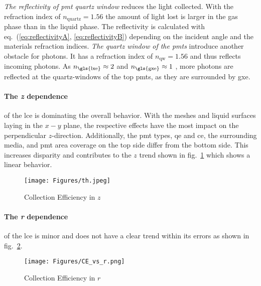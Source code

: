 \emph{The reflectivity of \gls{pmt} quartz window} reduces the light collected. With the refraction index of $ n_\mathrm{quartz} = 1.56 $ the amount of light lost is larger in the gas phase than in the liquid phase. The reflectivity is calculated with eq.~(\ref{eq:reflectivityA}, \ref{eq:reflectivityB}) depending on the incident angle and the materials refraction indices.
\emph{The quartz window of the \glspl{pmt}} introduce another obstacle for photons.
It has a refraction index of $ n_\mathrm{qw} = 1.56 $ and thus reflects incoming photons.
As $ n_\mathrm{\gls{lxe}} \approx 2 $ and $ n_\mathrm{\gls{gxe}} \approx 1 $ , more photons are reflected at the quartz-windows of the top \glspl{pmt}, as they are surrounded by \gls{gxe}.


\paragraph{The \emph{z} dependence} of the \gls{lce} is dominating the overall behavior.
With the meshes and liquid surfaces laying in the $ x-y $ plane, the respective effects have the most impact on the perpendicular $ z $-direction.
Additionally, the \gls{pmt} types, \gls{qe} and \gls{ce}, the surrounding media, and \gls{pmt} area coverage on the top side differ from the bottom side.
This increases disparity and contributes to the $ z $ trend shown in fig.~\ref{fig:ce_vs_z} which shows a linear behavior.


\begin{figure}
\centering
\texttt{[image: Figures/th.jpeg]}  %
\caption[Collection Efficiency in $ z $]{
        Collection Efficiency in $ z $
    }
\label{fig:ce_vs_z}
\end{figure}

\paragraph{The \emph{r} dependence} of the \gls{lce} is minor and does not have a clear trend within its errors as shown in fig.~\ref{fig:ce_vs_r}.

\begin{figure}
\centering
    \texttt{[image: Figures/CE\_vs\_r.png]}  %
\caption[Collection Efficiency in $ r $]{
    Collection Efficiency in $ r $
    }
\label{fig:ce_vs_r}
\end{figure}


